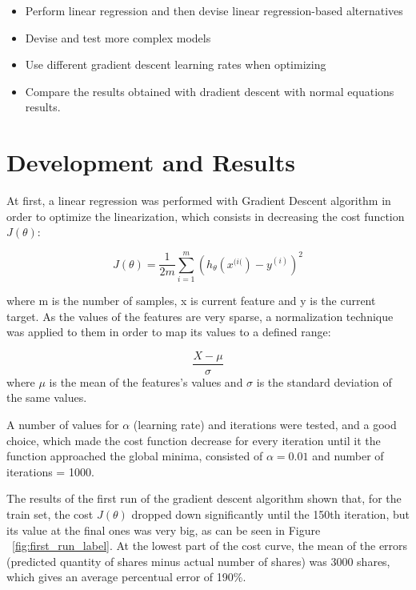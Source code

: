 \documentclass[10pt,twocolumn,letterpaper]{article}
\begin{document}
\begin{itemize}
	\item Perform linear regression and then devise linear regression-based alternatives
	\item Devise and test more complex models
	\item Use different gradient descent learning rates when optimizing
	\item Compare the results obtained with dradient descent with normal equations results.
\end{itemize}

\section{Development and Results}
At first, a linear regression was performed with Gradient Descent algorithm in order to optimize the linearization, which consists in decreasing the cost function $J(\theta)$:

\begin{equation}\label{eq:gdcost}
J(\theta) = \frac{1}{2m} \sum\limits_{i=1}^m  (h_{\theta}(x^{(i(})-y^{(i)})^{2}
\end{equation}

where m is the number of samples, x is current feature and y is the current target.
As the values of the features are very sparse, a normalization technique was applied to them in order to map its values to a defined range:

\begin{equation}\label{eq:normalization}
\dfrac{X - \mu}{\sigma}
\end{equation}
where $\mu$ is the mean of the features's values and $\sigma$ is the standard deviation of the same values.

A number of values for $\alpha$ (learning rate) and iterations were tested, and a good choice, which made the cost function decrease for every iteration until it the function approached the global minima, consisted of $\alpha = 0.01$ and number of iterations = 1000.

The results of the first run of the gradient descent algorithm shown that, for the train set, the cost $J(\theta)$ dropped down significantly until the 150th iteration, but its value at the final ones was very big, as can be seen in Figure ~\ref{fig:first_run_label}. At the lowest part of the cost curve, the mean of the errors (predicted quantity of shares minus actual number of shares) was 3000 shares, which gives an average percentual error of 190$\%$.
\end{document}
